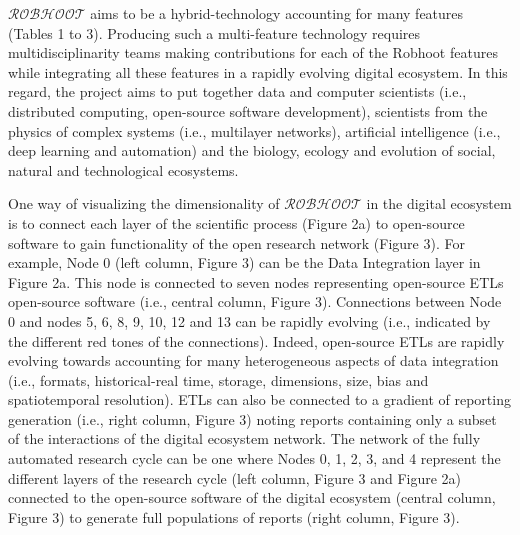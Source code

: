 \documentclass[10pt, a4paper, twocolumn]{article} %
\begin{document}
  {\bf $\mathcal{ROBHOOT}$} aims to be a hybrid-technology accounting
  for many features (Tables 1 to 3). Producing such a multi-feature
  technology requires multidisciplinarity teams making contributions
  for each of the Robhoot features while integrating all these
  features in a rapidly evolving digital ecosystem. In this regard,
  the project aims to put together data and computer scientists (i.e.,
  distributed computing, open-source software development), scientists
  from the physics of complex systems (i.e., multilayer networks),
  artificial intelligence (i.e., deep learning and automation) and the
  biology, ecology and evolution of social, natural and technological
  ecosystems.

  One way of visualizing the dimensionality of $\mathcal{ROBHOOT}$ in
  the digital ecosystem is to connect each layer of the scientific
  process (Figure 2a) to open-source software to gain functionality of
  the open research network (Figure 3). For example, Node 0 (left
  column, Figure 3) can be the Data Integration layer in Figure
  2a. This node is connected to seven nodes representing open-source
  ETLs open-source software (i.e., central column, Figure
  3). Connections between Node 0 and nodes 5, 6, 8, 9, 10, 12 and 13
  can be rapidly evolving (i.e., indicated by the different red tones
  of the connections). Indeed, open-source ETLs are rapidly evolving
  towards accounting for many heterogeneous aspects of data
  integration (i.e., formats, historical-real time, storage,
  dimensions, size, bias and spatiotemporal resolution). ETLs can also
  be connected to a gradient of reporting generation (i.e., right
  column, Figure 3) noting reports containing only a subset of the
  interactions of the digital ecosystem network. The network of the
  fully automated research cycle can be one where Nodes 0, 1, 2, 3,
  and 4 represent the different layers of the research cycle (left
  column, Figure 3 and Figure 2a) connected to the open-source
  software of the digital ecosystem (central column, Figure 3) to
  generate full populations of reports (right column, Figure 3).
\end{document}
